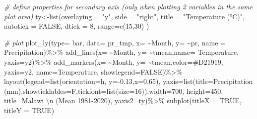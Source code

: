 \documentclass[
]{book}
\newenvironment{Shaded}{\begin{snugshade}}{\end{snugshade}}
\newcommand{\AttributeTok}[1]{\textcolor[rgb]{0.77,0.63,0.00}{#1}}
\newcommand{\CommentTok}[1]{\textcolor[rgb]{0.56,0.35,0.01}{\textit{#1}}}
\newcommand{\ConstantTok}[1]{\textcolor[rgb]{0.00,0.00,0.00}{#1}}
\newcommand{\DecValTok}[1]{\textcolor[rgb]{0.00,0.00,0.81}{#1}}
\newcommand{\FloatTok}[1]{\textcolor[rgb]{0.00,0.00,0.81}{#1}}
\newcommand{\FunctionTok}[1]{\textcolor[rgb]{0.00,0.00,0.00}{#1}}
\newcommand{\NormalTok}[1]{#1}
\newcommand{\OtherTok}[1]{\textcolor[rgb]{0.56,0.35,0.01}{#1}}
\newcommand{\SpecialCharTok}[1]{\textcolor[rgb]{0.00,0.00,0.00}{#1}}
\newcommand{\StringTok}[1]{\textcolor[rgb]{0.31,0.60,0.02}{#1}}
\begin{document}
\begin{Shaded}
\begin{Highlighting}[]
\CommentTok{\# define properties for secondary axis (only when plotting 2 variables in the same plot area)}
\NormalTok{ty}\OtherTok{\textless{}{-}}\FunctionTok{list}\NormalTok{(}\AttributeTok{overlaying =} \StringTok{"y"}\NormalTok{,}
  \AttributeTok{side =} \StringTok{"right"}\NormalTok{,}
  \AttributeTok{title =} \StringTok{"Temperature (°C)"}\NormalTok{,}
  \AttributeTok{autotick =} \ConstantTok{FALSE}\NormalTok{,}
      \AttributeTok{dtick =} \DecValTok{8}\NormalTok{,}
 \AttributeTok{range=}\FunctionTok{c}\NormalTok{(}\DecValTok{15}\NormalTok{,}\DecValTok{30}\NormalTok{)}
\NormalTok{  )}

\CommentTok{\# plot }
\FunctionTok{plot\_ly}\NormalTok{(}\AttributeTok{type=} \StringTok{\textquotesingle{}bar\textquotesingle{}}\NormalTok{, }\AttributeTok{data=}\NormalTok{ pr\_tmp, }\AttributeTok{x=} \SpecialCharTok{\textasciitilde{}}\NormalTok{Month, }\AttributeTok{y=} \SpecialCharTok{\textasciitilde{}}\NormalTok{pr, }\AttributeTok{name =} \StringTok{\textquotesingle{}Precipitation\textquotesingle{}}\NormalTok{)}\SpecialCharTok{\%\textgreater{}\%}
 \FunctionTok{add\_lines}\NormalTok{(}\AttributeTok{x=} \SpecialCharTok{\textasciitilde{}}\NormalTok{Month, }\AttributeTok{y=} \SpecialCharTok{\textasciitilde{}}\NormalTok{tmean,}\AttributeTok{name=} \StringTok{\textquotesingle{}Temperature\textquotesingle{}}\NormalTok{, }\AttributeTok{yaxis=}\StringTok{\textquotesingle{}y2\textquotesingle{}}\NormalTok{)}\SpecialCharTok{\%\textgreater{}\%}
  \FunctionTok{add\_markers}\NormalTok{(}\AttributeTok{x=} \SpecialCharTok{\textasciitilde{}}\NormalTok{Month, }\AttributeTok{y=} \SpecialCharTok{\textasciitilde{}}\NormalTok{tmean,}\AttributeTok{color=}\StringTok{\textquotesingle{}\#D21919\textquotesingle{}}\NormalTok{, }\AttributeTok{yaxis=}\StringTok{\textquotesingle{}y2\textquotesingle{}}\NormalTok{, }\AttributeTok{name=}\StringTok{\textquotesingle{}Temperature\textquotesingle{}}\NormalTok{, }\AttributeTok{showlegend=}\ConstantTok{FALSE}\NormalTok{)}\SpecialCharTok{\%\textgreater{}\%}
    \FunctionTok{layout}\NormalTok{(}\AttributeTok{legend=}\FunctionTok{list}\NormalTok{(}\AttributeTok{orientation=}\StringTok{\textquotesingle{}h\textquotesingle{}}\NormalTok{, }\AttributeTok{y=}\SpecialCharTok{{-}}\FloatTok{0.13}\NormalTok{,}\AttributeTok{x=}\FloatTok{0.65}\NormalTok{), }\AttributeTok{yaxis=}\FunctionTok{list}\NormalTok{(}\AttributeTok{title=}\StringTok{\textquotesingle{}Precipitation (mm)\textquotesingle{}}\NormalTok{,}\AttributeTok{showticklables=}\NormalTok{F,}\AttributeTok{tickfont=}\FunctionTok{list}\NormalTok{(}\AttributeTok{size=}\DecValTok{16}\NormalTok{)),}\AttributeTok{width=}\DecValTok{700}\NormalTok{, }\AttributeTok{height=}\DecValTok{450}\NormalTok{, }\AttributeTok{title=}\StringTok{\textquotesingle{}Malawi }\SpecialCharTok{\textbackslash{}n}\StringTok{ (Mean 1981{-}2020)\textquotesingle{}}\NormalTok{, }\AttributeTok{yaxis2=}\NormalTok{ty)}\SpecialCharTok{\%\textgreater{}\%}
  \FunctionTok{subplot}\NormalTok{(}\AttributeTok{titleX =} \ConstantTok{TRUE}\NormalTok{, }\AttributeTok{titleY =} \ConstantTok{TRUE}\NormalTok{)}
\end{Highlighting}
\end{Shaded}
\end{document}

